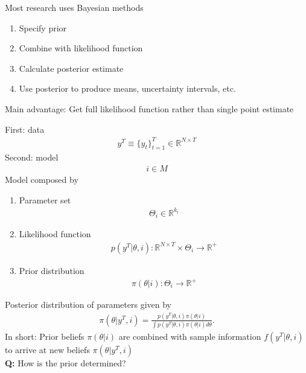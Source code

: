\documentclass{beamer}
\begin{document}
\begin{frame}
  Most research uses Bayesian methods
  \begin{enumerate}
    \item Specify prior
    \item Combine with likelihood function
    \item Calculate posterior estimate
    \item Use posterior to produce means, uncertainty intervals, etc. 
  \end{enumerate}
  \medskip
  Main advantage: Get full likelihood function rather than single point estimate
\end{frame}

\begin{frame}
  First: data
  \begin{align}
    y^T \equiv \{y_t \}^T_{t=1} \in \mathbb{R}^{N\times T}
  \end{align}
  Second: model
  \begin{align}
    i \in M
  \end{align}
  Model composed by
  \begin{enumerate}
    \item Parameter set
    \begin{align}
      \Theta_i \in \mathbb{R}^{k_i}
    \end{align}
    \item Likelihood function
    \begin{align}
      p(y^T | \theta,i): \mathbb{R}^{N\times T} \times \Theta_i \rightarrow \mathbb{R}^+
    \end{align}
    \item Prior distribution
    \begin{align}
      \pi(\theta|i): \Theta_i \rightarrow \mathbb{R}^+
    \end{align}
  \end{enumerate}
\end{frame}

\begin{frame}
 Posterior distribution of parameters given by
 \begin{align}
   \pi(\theta|y^T, i) = \frac{p(y^T|\theta,i)\pi(\theta|i)}{\int p(y^T|\theta,i)\pi(\theta|i)d\theta}.
 \end{align}
  In short: Prior beliefs $\pi(\theta|i)$ are combined with sample information $f(y^T|\theta,i)$ to arrive at new beliefs $\pi(\theta|y^T,i)$
  \\ \bigskip
  \textbf{Q:} How is the prior determined?
\end{frame}
\end{document}
